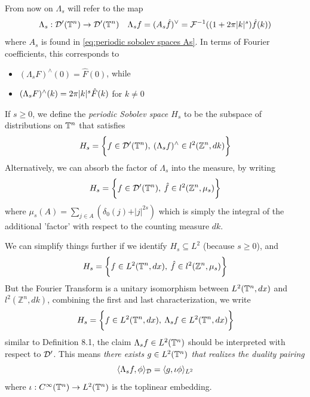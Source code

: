 \documentclass[../main-v2-manifolds.tex]{subfiles}
\begin{document}
\begin{remark}
From now on $\Lambda_s$ will refer to the map
\[
\Lambda_s: \mathcal{D}'({\mathbb{T}^n})\to\mathcal{D}'({\mathbb{T}^n})\quad\Lambda_s f =  (A_s\hat{f})^{\vee} = \mathcal{F}^{-1}((1+2\pi \vert {k} \vert^s)\hat{f}(k))
\]
where $A_s$ is found in \cref{eq:periodic sobolev spaces As}. In terms of Fourier coefficients, this corresponds to 
\begin{itemize}
    \item $(\Lambda_s F)^{\wedge}(0) = \hat{F}(0)$, while 
    \item $(\Lambda_s F)^{\wedge}(k) = 2\pi\vert {k} \vert^{s}\hat{F}(k)$ for $k\neq 0$
\end{itemize}
\end{remark}

\begin{definition}
If $s\geq 0$, we define the \emph{periodic Sobolev space $H_s$} to be the subspace of distributions on ${\mathbb{T}^n}$ that satisfies 
\[
H_s = \biggl\{{f\in \mathcal{D}'({\mathbb{T}^n}),\: (\Lambda_s f)^{\wedge}\in l^2(\mathbb{Z}^n,dk)}\biggr\}
\]
Alternatively, we can absorb the factor of $\Lambda_s$ into the measure, by writing 
\[
H_s = \biggl\{{f\in\mathcal{D}'({\mathbb{T}^n}),\: \hat{f}\in l^2(\mathbb{Z}^n,\mu_s)}\biggr\}
\]
where $\mu_s(A) = \sum_{j\in A}(\delta_0(j) + \vert j\vert^{2s})$ which is simply the integral of the additional 'factor' with respect to the counting measure $dk$. 
\end{definition}
\begin{remark}
We can simplify things further if we identify $H_s\subseteq L^2$ (because $s\geq 0$), and
\[
H_s = \biggl\{{f\in L^2({\mathbb{T}^n},dx),\: \hat{f}\in l^2(\mathbb{Z}^n, \mu_s)}\biggr\}
\]
But the Fourier Transform is a unitary isomorphism between $L^2({\mathbb{T}^n},dx)$ and $l^2(\mathbb{Z}^n,dk)$, combining the first and last characterization, we write
\[
H_s = \biggl\{{f\in L^2({\mathbb{T}^n},dx),\: \Lambda_sf\in L^2({\mathbb{T}^n},dx)}\biggr\}
\]
similar to Definition 8.1, the claim $\Lambda_s f\in L^2({\mathbb{T}^n})$ should be interpreted with respect to $\mathcal{D}'$. This means \emph{there exists $g\in L^2({\mathbb{T}^n})$ that realizes the duality pairing}
\[
\langle \Lambda_s f,\phi\rangle_{\mathcal{D}}=\langle g,\iota\phi\rangle_{L^2}
\]
where $\iota:C^\infty({\mathbb{T}^n})\to L^2({\mathbb{T}^n})$ is the toplinear embedding.
\end{remark}
\end{document}
